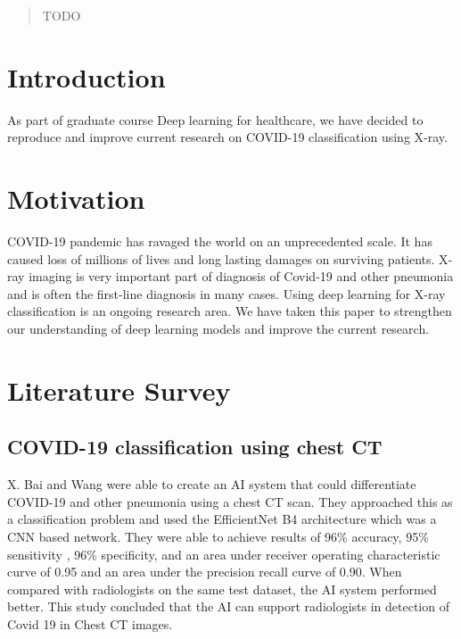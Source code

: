 \documentclass{sigkddExp}
\begin{document}
\date{30 July 1999}
\maketitle
\begin{abstract}
TODO
\end{abstract}

\section{Introduction}
As part of graduate course Deep learning for healthcare, we
have decided to reproduce and improve current research on COVID-19 classification using
X-ray.


\section{Motivation}
COVID-19 pandemic has ravaged the world on an unprecedented scale. It has caused loss
of millions of lives and long lasting damages on surviving patients. X-ray imaging
is very important part of diagnosis of Covid-19 and other pneumonia and is often the
first-line diagnosis in many cases. Using deep learning for X-ray classification is
an ongoing research area. We have taken this paper to strengthen our understanding of
deep learning models and improve the current research.


\section{Literature Survey}

\subsection{COVID-19 classification using chest CT}

X. Bai and Wang were able to create an AI system that could differentiate
COVID-19 and other pneumonia using a chest CT scan. They approached this
as a classification problem and used the EfficientNet B4 architecture which
was a CNN based network. They were able to achieve results of 96\% accuracy,
95\% sensitivity , 96\% specificity, and an area under receiver operating
characteristic curve of 0.95 and an area under the precision recall curve of
0.90. When compared with radiologists on the same test dataset, the AI system
performed better. This study concluded that the AI can support radiologists
in detection of Covid 19 in Chest CT images.
\end{document}
